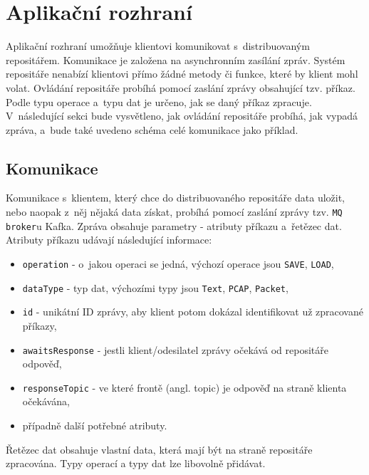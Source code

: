 \section{Aplikační rozhraní}
Aplikační rozhraní umožňuje klientovi komunikovat s~distribuovaným repositářem. Komunikace je založena na asynchronním zasílání zpráv. Systém repositáře nenabízí klientovi přímo žádné metody či funkce, které by klient mohl volat. Ovládání repositáře probíhá pomocí zaslání zprávy obsahující tzv. příkaz. Podle typu operace a~typu dat je určeno, jak se daný příkaz zpracuje. V~následující sekci bude vysvětleno, jak ovládání repositáře probíhá, jak vypadá zpráva, a~bude také uvedeno schéma celé komunikace jako příklad.

\subsection{Komunikace}
Komunikace s~klientem, který chce do distribuovaného repositáře data uložit, nebo naopak z~něj nějaká data získat, probíhá pomocí zaslání zprávy tzv. \texttt{MQ broker}u Kafka. Zpráva obsahuje parametry - atributy příkazu a~řetězec dat. Atributy příkazu udávají následující informace:

\begin{itemize}
    \item \texttt{operation} - o~jakou operaci se jedná, výchozí operace jsou \texttt{SAVE}, \texttt{LOAD},
    
    \item \texttt{dataType} - typ dat,  výchozími typy jsou \texttt{Text}, \texttt{PCAP}, \texttt{Packet},
    
    \item \texttt{id} - unikátní ID zprávy, aby klient potom dokázal identifikovat už zpracované příkazy,
    
    \item \texttt{awaitsResponse} - jestli klient/odesilatel zprávy očekává od repositáře odpověď,
    
    \item \texttt{responseTopic} - ve které frontě (angl. topic) je odpověď na straně klienta očekávána,
    
    \item případně další potřebné atributy.
\end{itemize}

\noindent Řetězec dat obsahuje vlastní data, která mají být na straně repositáře zpracována. Typy operací a typy dat lze libovolně přidávat.

